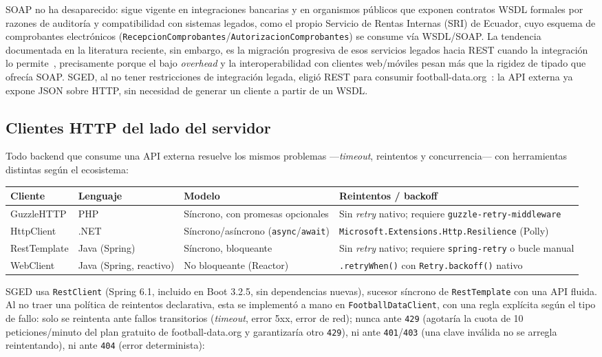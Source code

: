 \documentclass[11pt,a4paper]{article}
\begin{document}
SOAP no ha desaparecido: sigue vigente en integraciones bancarias y en
organismos públicos que exponen contratos WSDL formales por razones de
auditoría y compatibilidad con sistemas legados, como el propio Servicio de
Rentas Internas (SRI) de Ecuador, cuyo esquema de comprobantes electrónicos
(\texttt{RecepcionComprobantes}/\texttt{AutorizacionComprobantes}) se
consume vía WSDL/SOAP. La tendencia documentada en la literatura reciente,
sin embargo, es la migración progresiva de esos servicios legados hacia
REST cuando la integración lo permite~\cite{chitiprolu2026}, precisamente
porque el bajo \emph{overhead} y la interoperabilidad con clientes
web/móviles pesan más que la rigidez de tipado que ofrecía SOAP. SGED, al
no tener restricciones de integración legada, eligió REST para consumir
football-data.org~\cite{footballdata}: la API externa ya expone JSON sobre
HTTP, sin necesidad de generar un cliente a partir de un WSDL.

\subsection{Clientes HTTP del lado del servidor}

Todo backend que consume una API externa resuelve los mismos problemas
—\emph{timeout}, reintentos y concurrencia— con herramientas distintas
según el ecosistema:

\begin{center}
\begin{tabular}{@{}lllp{4.3cm}@{}}
\toprule
\textbf{Cliente} & \textbf{Lenguaje} & \textbf{Modelo} & \textbf{Reintentos / backoff} \\
\midrule
GuzzleHTTP & PHP & Síncrono, con promesas opcionales & Sin \emph{retry} nativo; requiere \texttt{guzzle-retry-middleware} \\
HttpClient & .NET & Síncrono/asíncrono (\texttt{async}/\texttt{await}) & \texttt{Microsoft.Extensions.Http.Resilience} (Polly) \\
RestTemplate & Java (Spring) & Síncrono, bloqueante & Sin \emph{retry} nativo; requiere \texttt{spring-retry} o bucle manual \\
WebClient & Java (Spring, reactivo) & No bloqueante (Reactor) & \texttt{.retryWhen()} con \texttt{Retry.backoff()} nativo \\
\bottomrule
\end{tabular}
\end{center}

SGED usa \texttt{RestClient} (Spring 6.1, incluido en Boot 3.2.5, sin
dependencias nuevas), sucesor síncrono de \texttt{RestTemplate} con una API
fluida. Al no traer una política de reintentos declarativa, esta se
implementó a mano en \texttt{FootballDataClient}, con una regla explícita
según el tipo de fallo: solo se reintenta ante fallos transitorios
(\emph{timeout}, error 5xx, error de red); nunca ante \texttt{429}
(agotaría la cuota de 10 peticiones/minuto del plan gratuito de
football-data.org y garantizaría otro \texttt{429}), ni ante
\texttt{401}/\texttt{403} (una clave inválida no se arregla reintentando),
ni ante \texttt{404} (error determinista):
\end{document}
